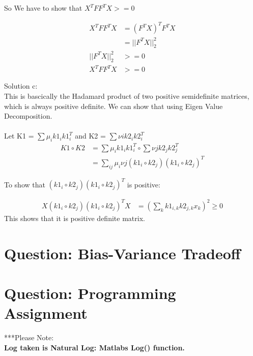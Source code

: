 \documentclass[paper=a4, fontsize=11pt]{scrartcl} %
\numberwithin{equation}{section} %
\numberwithin{figure}{section} %
\numberwithin{table}{section} %
\begin{document}
So We have to show that $X^{T}FF^{T}X >=0$ 

\begin{align*}
X^{T}FF^{T}X &= (F^{T}X)^{T}F^{T}X\\
&= || F^{T}X ||_{2}^{2}\\
|| F^{T}X ||_{2}^{2} &>=0\\
X^{T}FF^{T}X &>= 0
\end{align*}


Solution c:\\
This is bascically the Hadamard product of two positive semidefinite matrices, which is always positive definite. We can show that using Eigen Value Decomposition.\\\\

Let K1 = $\sum\mu_{i}k1_{i}k1_{i}^{T}$ and K2 = $\sum\nu{i}k2_{i}k2_{i}^{T}$
\begin{align*}
K1 \circ K2 &= \sum\mu_{i}k1_{i}k1_{i}^{T} \circ \sum\nu{j}k2_{j}k2_{j}^{T}\\
&= \sum_{ij}\mu_{i}\nu{j}(k1_{i} \circ k2_{j})(k1_{i} \circ k2_{j})^{T}
\end{align*}

To show that $(k1_{i} \circ k2_{j})(k1_{i} \circ k2_{j})^{T}$ is positive:

\begin{align*}
X(k1_{i} \circ k2_{j})(k1_{i} \circ k2_{j})^{T}X &= (\sum_{k}k1_{i,k}k2_{j,k}x_{k})^{2} \geq 0
\end{align*}
This shows that it is positive definite matrix.
\section{Question: Bias-Variance Tradeoff}




\section{Question: Programming Assignment}

\begin{large}
***Please Note: \\
\textbf{Log taken is Natural Log: Matlabs Log() function.}
\end{large}\\\\
\end{document}
